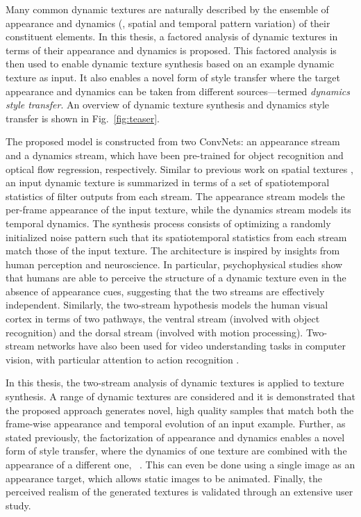 Many common dynamic textures are naturally described by the ensemble of 
appearance and dynamics (\ie, spatial and temporal pattern variation) of their 
constituent elements. In this thesis, a factored analysis of dynamic 
textures in terms of their appearance and dynamics is proposed.
This factored analysis is then used to enable dynamic texture synthesis
based on an example dynamic texture as input.
It also enables a novel form of style transfer where the 
target appearance and dynamics can be taken from different sources---termed \emph{dynamics style transfer}.
An overview of dynamic texture synthesis and dynamics style transfer
is shown in Fig.\ \ref{fig:teaser}.
\clearpage

\clearpage
The proposed model is constructed from two ConvNets: an appearance stream and a dynamics stream,
which have been pre-trained for object recognition
and optical flow regression, respectively.
Similar to previous work on spatial textures
\cite{gatys2015,heeger1995pyramid,portilla2000parametric}, an input dynamic texture is summarized in terms of a set of
spatiotemporal statistics of filter outputs from each stream.
The appearance stream models the per-frame appearance of
the input texture, while the dynamics stream models its
temporal dynamics.
The synthesis process consists of optimizing a randomly initialized noise pattern such that its spatiotemporal statistics from
each stream match those of the input texture.
The architecture is inspired by insights from human perception and 
neuroscience.
In particular, psychophysical studies \cite{cutting1982} show that
humans are able to perceive the structure of a dynamic texture even
in the absence of appearance cues, suggesting that the two streams
are effectively independent.
Similarly, the two-stream hypothesis \cite{goodale1992} models the 
human visual cortex in terms of two pathways, the ventral stream
(involved with object recognition) and the
dorsal stream (involved with motion processing). Two-stream networks have also been used for video understanding tasks in computer vision, with particular attention to action recognition \cite{simonyan2014,feichtenhofer2016two}.

In this thesis, the two-stream analysis of
dynamic textures is applied to texture synthesis.
A range of dynamic textures are considered and it is demonstrated that the 
proposed approach generates novel, high quality samples that match
both the frame-wise appearance and temporal evolution of an input
example.
Further, as stated previously, the factorization of appearance and dynamics enables a 
novel form of style transfer, where the dynamics of one texture are 
combined with the appearance of a different one,
\cf\ \cite{gatys2016image}.
This can even be done using a single image as an appearance
target, which allows static images to be animated.
Finally, the perceived realism of the generated textures is validated
through an extensive user study.

